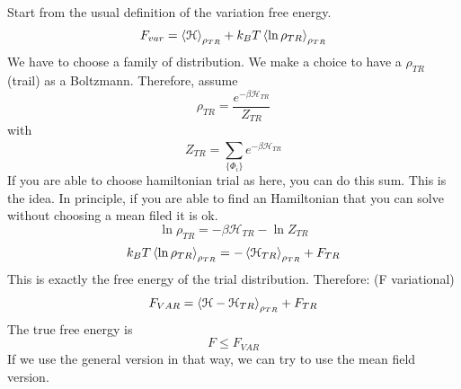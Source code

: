 \documentclass[../main/main.tex]{subfiles}
\begin{document}

Start from the usual definition of the variation free energy.
\begin{equation}
  F_{var} = \expval{\mathcal{H}}_{\rho _{TR}} + k_B T \expval{\ln{\rho _{TR}} }_{\rho _{TR}}
\end{equation}
We have to choose a family of distribution. We make a choice to have a \( \rho _{TR} \) (trail)  as a Boltzmann. Therefore, assume
\begin{equation}
  \rho _{TR} = \frac{e^{- \beta \mathcal{H}_{TR}} }{Z_{TR}}
\end{equation}
with
\begin{equation}
  Z_{TR} = \sum_{\{ \Phi _i \}  }^{}   e^{- \beta \mathcal{H}_{TR}}
\end{equation}
If you are able to choose hamiltonian trial as here, you can do this sum. This is the idea. In principle, if you are able to find an Hamiltonian that you can solve without choosing a mean filed it is ok.
\begin{equation}
  \ln{\rho _{TR}} = - \beta \mathcal{H}_{TR} - \ln{Z_{TR}}
\end{equation}
\begin{equation}
  k_B T \expval{\ln{\rho _{TR}}}_{\rho _{TR}} = - \expval{\mathcal{H}_{TR}}_{\rho _{TR}} + F_{TR}
\end{equation}
This is exactly the free energy of the trial distribution. Therefore: (F variational)
\begin{equation}
  F_{VAR} = \expval{\mathcal{H}-\mathcal{H}_{TR}}_{\rho _{TR}} + F_{TR}
\end{equation}
The true free energy is
\begin{equation}
  F \le F_{VAR}
\end{equation}
If we use the general version in that way, we can try to use the mean field version.
\end{document}

